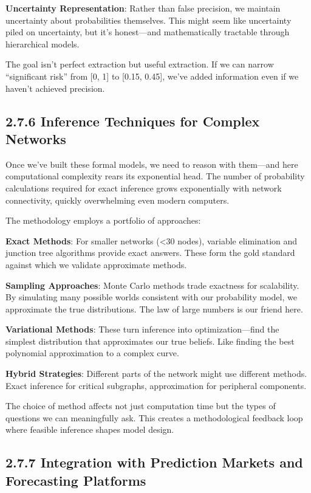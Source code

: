 \documentclass[
  11pt,
  letterpaper,
]{book}
\begin{document}
\textbf{Uncertainty Representation}: Rather than false precision, we
maintain uncertainty about probabilities themselves. This might seem
like uncertainty piled on uncertainty, but it's honest---and
mathematically tractable through hierarchical models.

The goal isn't perfect extraction but useful extraction. If we can
narrow ``significant risk'' from {[}0, 1{]} to {[}0.15, 0.45{]}, we've
added information even if we haven't achieved precision.

\subsection{2.7.6 Inference Techniques for Complex
Networks}\label{sec-inference-techniques}

Once we've built these formal models, we need to reason with them---and
here computational complexity rears its exponential head. The number of
probability calculations required for exact inference grows
exponentially with network connectivity, quickly overwhelming even
modern computers.

The methodology employs a portfolio of approaches:

\textbf{Exact Methods}: For smaller networks (\textless30 nodes),
variable elimination and junction tree algorithms provide exact answers.
These form the gold standard against which we validate approximate
methods.

\textbf{Sampling Approaches}: Monte Carlo methods trade exactness for
scalability. By simulating many possible worlds consistent with our
probability model, we approximate the true distributions. The law of
large numbers is our friend here.

\textbf{Variational Methods}: These turn inference into
optimization---find the simplest distribution that approximates our true
beliefs. Like finding the best polynomial approximation to a complex
curve.

\textbf{Hybrid Strategies}: Different parts of the network might use
different methods. Exact inference for critical subgraphs, approximation
for peripheral components.

The choice of method affects not just computation time but the types of
questions we can meaningfully ask. This creates a methodological
feedback loop where feasible inference shapes model design.

\subsection{2.7.7 Integration with Prediction Markets and Forecasting
Platforms}\label{sec-prediction-markets}
\end{document}
